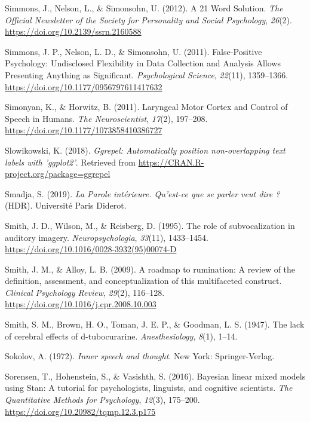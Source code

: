 \documentclass[a4paper,12pt,twoside,onecolumn,openright,final,oldfontcommands]{memoir}
\begin{document}
\leavevmode\hypertarget{ref-simmons_21_2012}{}%
Simmons, J., Nelson, L., \& Simonsohn, U. (2012). A 21 Word Solution. \emph{The Official Newsletter of the Society for Personality and Social Psychology}, \emph{26}(2). \url{https://doi.org/10.2139/ssrn.2160588}

\leavevmode\hypertarget{ref-simmons_false-positive_2011}{}%
Simmons, J. P., Nelson, L. D., \& Simonsohn, U. (2011). False-Positive Psychology: Undisclosed Flexibility in Data Collection and Analysis Allows Presenting Anything as Significant. \emph{Psychological Science}, \emph{22}(11), 1359--1366. \url{https://doi.org/10.1177/0956797611417632}

\leavevmode\hypertarget{ref-simonyan_laryngeal_2011}{}%
Simonyan, K., \& Horwitz, B. (2011). Laryngeal Motor Cortex and Control of Speech in Humans. \emph{The Neuroscientist}, \emph{17}(2), 197--208. \url{https://doi.org/10.1177/1073858410386727}

\leavevmode\hypertarget{ref-R-ggrepel}{}%
Slowikowski, K. (2018). \emph{Ggrepel: Automatically position non-overlapping text labels with 'ggplot2'}. Retrieved from \url{https://CRAN.R-project.org/package=ggrepel}

\leavevmode\hypertarget{ref-smadja_parole_2019}{}%
Smadja, S. (2019). \emph{La Parole intérieure. Qu'est-ce que se parler veut dire ?} (HDR). Université Paris Diderot.

\leavevmode\hypertarget{ref-smith_role_1995}{}%
Smith, J. D., Wilson, M., \& Reisberg, D. (1995). The role of subvocalization in auditory imagery. \emph{Neuropsychologia}, \emph{33}(11), 1433--1454. \url{https://doi.org/10.1016/0028-3932(95)00074-D}

\leavevmode\hypertarget{ref-Smith2009}{}%
Smith, J. M., \& Alloy, L. B. (2009). A roadmap to rumination: A review of the definition, assessment, and conceptualization of this multifaceted construct. \emph{Clinical Psychology Review}, \emph{29}(2), 116--128. \url{https://doi.org/10.1016/j.cpr.2008.10.003}

\leavevmode\hypertarget{ref-smith_lack_1947}{}%
Smith, S. M., Brown, H. O., Toman, J. E. P., \& Goodman, L. S. (1947). The lack of cerebral effects of d-tubocurarine. \emph{Anesthesiology}, \emph{8}(1), 1--14.

\leavevmode\hypertarget{ref-sokolov_inner_1972}{}%
Sokolov, A. (1972). \emph{Inner speech and thought}. New York: Springer-Verlag.

\leavevmode\hypertarget{ref-sorensen_bayesian_2016}{}%
Sorensen, T., Hohenstein, S., \& Vasishth, S. (2016). Bayesian linear mixed models using Stan: A tutorial for psychologists, linguists, and cognitive scientists. \emph{The Quantitative Methods for Psychology}, \emph{12}(3), 175--200. \url{https://doi.org/10.20982/tqmp.12.3.p175}
\end{document}
